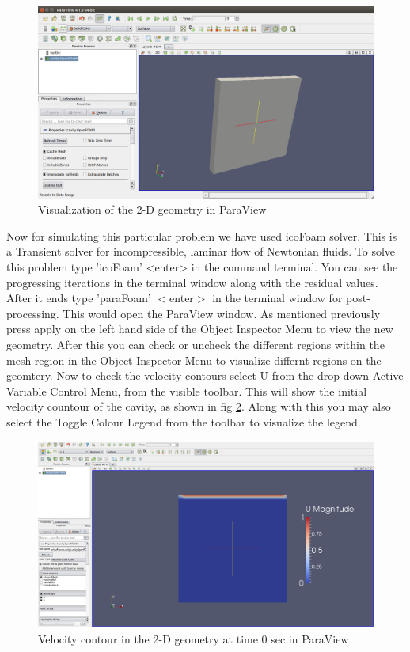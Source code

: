 \documentclass[a4paper,12pt]{report}
\begin{document}
\begin{figure}[ht]  
\begin{center}  
\includegraphics[scale=0.32]{paraview1.png}
\caption{Visualization of the 2-D geometry in ParaView}
\label{paraview1}
\end{center}  
\end{figure}

\flushleft Now for simulating this particular problem we have used icoFoam solver. This is a Transient solver for incompressible, laminar flow of Newtonian fluids. To solve this problem type 'icoFoam' <enter> in the command terminal. You can see the progressing iterations in the terminal window along with the residual values. After it ends type 'paraFoam' $<$enter$>$ in the terminal window for post-processing. 
\flushleft This would open the ParaView window. As mentioned previously press apply on the left hand side of the Object Inspector Menu to view the new geometry. After this you can check or uncheck the different regions within the mesh region in  the Object Inspector Menu to visualize differnt regions on the geomtery. Now to check the velocity contours select U from the drop-down Active Variable Control Menu, from the visible toolbar. This will show the initial velocity countour of the cavity, as shown in fig \ref{vel1}. Along with this you may also select the Toggle Colour Legend from the toolbar to visualize the legend.

\begin{figure}[ht]  
\begin{center}  
\includegraphics[scale=0.24]{vel1.png}
\caption{Velocity contour in the 2-D geometry at time 0 sec in ParaView}
\label{vel1}
\end{center}  
\end{figure}
\end{document}
